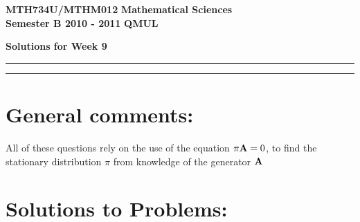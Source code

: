 \documentclass[11pt,a4paper]{article}
\begin{document}
  \newpage
  \textbf{MTH734U/MTHM012} \hfill \textbf{Mathematical Sciences}\\
  \textbf{Semester B 2010 - 2011} \hfill \textbf{QMUL}
  \begin{center}
    \textbf{\huge Solutions for Week 9}
  \end{center}
  \hrule \vspace{2mm} \hrule

  \section*{General comments:}
  All of these questions rely on the use of the equation $\pi \vb{A} = 0$, to find the stationary distribution $\pi$ from knowledge of the generator $\vb{A}$

  \section*{Solutions to Problems:}
\end{document}
